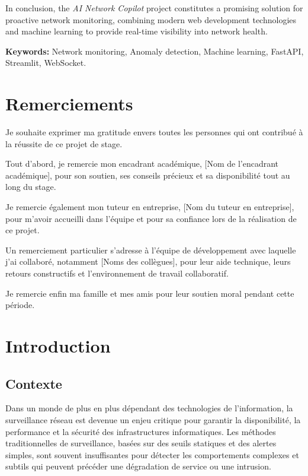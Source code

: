 \documentclass[12pt,a4paper]{report}
\begin{document}
In conclusion, the \textit{AI Network Copilot} project constitutes a promising solution for proactive network monitoring, combining modern web development technologies and machine learning to provide real-time visibility into network health.

\textbf{Keywords:} Network monitoring, Anomaly detection, Machine learning, FastAPI, Streamlit, WebSocket.

\tableofcontents
\thispagestyle{empty}

\chapter{Remerciements}
\thispagestyle{empty}

Je souhaite exprimer ma gratitude envers toutes les personnes qui ont contribué à la réussite de ce projet de stage.

Tout d'abord, je remercie mon encadrant académique, [Nom de l'encadrant académique], pour son soutien, ses conseils précieux et sa disponibilité tout au long du stage.

Je remercie également mon tuteur en entreprise, [Nom du tuteur en entreprise], pour m'avoir accueilli dans l'équipe et pour sa confiance lors de la réalisation de ce projet.

Un remerciement particulier s'adresse à l'équipe de développement avec laquelle j'ai collaboré, notamment [Noms des collègues], pour leur aide technique, leurs retours constructifs et l'environnement de travail collaboratif.

Je remercie enfin ma famille et mes amis pour leur soutien moral pendant cette période.

\chapter{Introduction}
\section{Contexte}
Dans un monde de plus en plus dépendant des technologies de l'information, la surveillance réseau est devenue un enjeu critique pour garantir la disponibilité, la performance et la sécurité des infrastructures informatiques. Les méthodes traditionnelles de surveillance, basées sur des seuils statiques et des alertes simples, sont souvent insuffisantes pour détecter les comportements complexes et subtils qui peuvent précéder une dégradation de service ou une intrusion.
\end{document}
